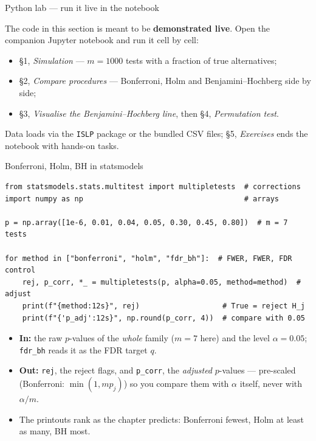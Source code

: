 \documentclass[aspectratio=169,11pt]{beamer}
\begin{document}
\begin{frame}{Python lab --- run it live in the notebook}
  \begin{labnote}
    The code in this section is meant to be \textbf{demonstrated live}. Open the companion Jupyter notebook and run it cell by cell:
    \begin{itemize}
      \item \S1, \emph{Simulation} --- $m=1000$ tests with a fraction of true alternatives;
      \item \S2, \emph{Compare procedures} --- Bonferroni, Holm and Benjamini--Hochberg side by side;
      \item \S3, \emph{Visualise the Benjamini--Hochberg line}, then \S4, \emph{Permutation test}.
    \end{itemize}
    Data loads via the \texttt{ISLP} package or the bundled CSV files; \S5, \emph{Exercises} ends the notebook with hands-on tasks.
  \end{labnote}
\end{frame}



\begin{frame}[fragile]{Bonferroni, Holm, BH in statsmodels}
  \begin{lstlisting}
from statsmodels.stats.multitest import multipletests  # corrections
import numpy as np                                     # arrays

p = np.array([1e-6, 0.01, 0.04, 0.05, 0.30, 0.45, 0.80])  # m = 7 tests

for method in ["bonferroni", "holm", "fdr_bh"]:  # FWER, FWER, FDR control
    rej, p_corr, *_ = multipletests(p, alpha=0.05, method=method)  # adjust
    print(f"{method:12s}", rej)                   # True = reject H_j
    print(f"{'p_adj':12s}", np.round(p_corr, 4))  # compare with 0.05
  \end{lstlisting}
  \begin{readme}
    \scriptsize
    \begin{itemize}
      \item \textbf{In:} the raw $p$-values of the \emph{whole} family ($m=7$ here)
            and the level $\alpha=0.05$; \texttt{fdr\_bh} reads it as the FDR target $q$.
      \item \textbf{Out:} \texttt{rej}, the reject flags, and \texttt{p\_corr}, the
            \emph{adjusted} $p$-values --- pre-scaled (Bonferroni: $\min(1, m p_j)$) so
            you compare them with $\alpha$ itself, never with $\alpha/m$.
      \item The printouts rank as the chapter predicts: Bonferroni fewest, Holm
            at least as many, BH most.
    \end{itemize}
  \end{readme}
\end{frame}
\end{document}
